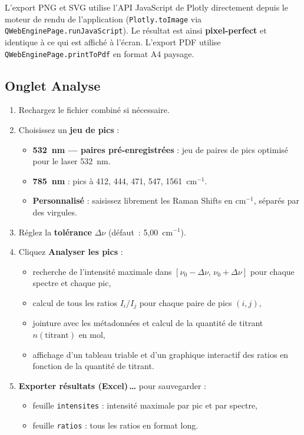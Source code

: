 \documentclass[12pt, a4paper]{article}
\newcommand{\cm}{cm$^{-1}$}
\begin{document}
L'export PNG et SVG utilise l'API JavaScript de Plotly directement depuis le
moteur de rendu de l'application (\texttt{Plotly.toImage} via
\texttt{QWebEnginePage.runJavaScript}). Le résultat est ainsi
\textbf{pixel-perfect} et identique à ce qui est affiché à l'écran.
L'export PDF utilise \texttt{QWebEnginePage.printToPdf} en format A4 paysage.

\subsection{Onglet Analyse}

\begin{enumerate}
  \item Rechargez le fichier combiné si nécessaire.
  \item Choisissez un \textbf{jeu de pics} :
    \begin{itemize}
      \item \textbf{532~nm — paires pré-enregistrées} : jeu de paires de pics
            optimisé pour le laser 532~nm.
      \item \textbf{785~nm} : pics à 412, 444, 471, 547, 1561~\cm.
      \item \textbf{Personnalisé} : saisissez librement les Raman Shifts en
            \cm, séparés par des virgules.
    \end{itemize}
  \item Réglez la \textbf{tolérance} $\Delta\nu$ (défaut~: 5{,}00~\cm).
  \item Cliquez \textbf{Analyser les pics} :
    \begin{itemize}
      \item recherche de l'intensité maximale dans $[\nu_0 - \Delta\nu,\,
            \nu_0 + \Delta\nu]$ pour chaque spectre et chaque pic,
      \item calcul de tous les ratios $I_i / I_j$ pour chaque paire de pics
            $(i, j)$,
      \item jointure avec les métadonnées et calcul de la quantité de titrant
            $n(\text{titrant})$ en mol,
      \item affichage d'un tableau triable et d'un graphique interactif des
            ratios en fonction de la quantité de titrant.
    \end{itemize}
  \item \textbf{Exporter résultats (Excel)\,\ldots} pour sauvegarder :
    \begin{itemize}
      \item feuille \texttt{intensites} : intensité maximale par pic et par
            spectre,
      \item feuille \texttt{ratios} : tous les ratios en format long.
    \end{itemize}
\end{enumerate}
\end{document}
